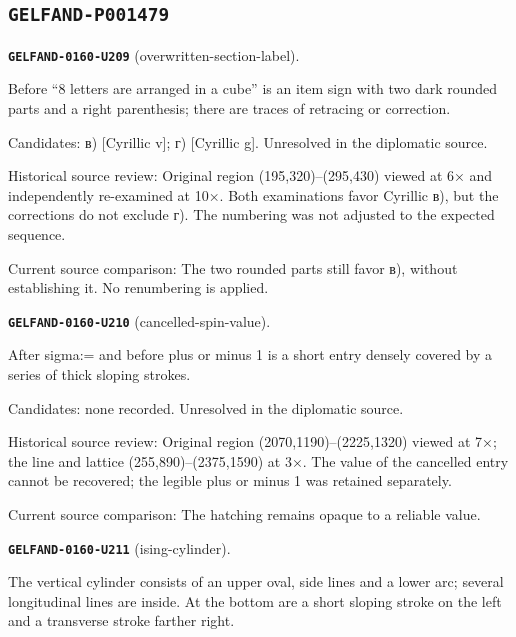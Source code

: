 \subsection*{\texttt{GELFAND-P001479}}
\par\noindent\leavevmode{}\label{GELFAND-0160-U209}\label{GELFAND-P001479:overwritten-section-label}\textbf{\texttt{GELFAND-0160-U209}} (overwritten-section-label).\nopagebreak[4]\par
Before “8 letters are arranged in a cube” is an item sign with two dark rounded parts and a right parenthesis; there are traces of retracing or correction.\par
Candidates: в) [Cyrillic v]; г) [Cyrillic g]. Unresolved in the diplomatic source.\par
Historical source review: Original region (195,320)–(295,430) viewed at 6× and independently re-examined at 10×. Both examinations favor Cyrillic в), but the corrections do not exclude г). The numbering was not adjusted to the expected sequence.\par
Current source comparison: The two rounded parts still favor в), without establishing it. No renumbering is applied.\par\medskip
\par\noindent\leavevmode{}\label{GELFAND-0160-U210}\label{GELFAND-P001479:cancelled-spin-value}\textbf{\texttt{GELFAND-0160-U210}} (cancelled-spin-value).\nopagebreak[4]\par
After sigma:= and before plus or minus 1 is a short entry densely covered by a series of thick sloping strokes.\par
Candidates: none recorded. Unresolved in the diplomatic source.\par
Historical source review: Original region (2070,1190)–(2225,1320) viewed at 7×; the line and lattice (255,890)–(2375,1590) at 3×. The value of the cancelled entry cannot be recovered; the legible plus or minus 1 was retained separately.\par
Current source comparison: The hatching remains opaque to a reliable value.\par\medskip
\par\noindent\leavevmode{}\label{GELFAND-0160-U211}\label{GELFAND-P001479:ising-cylinder}\textbf{\texttt{GELFAND-0160-U211}} (ising-cylinder).\nopagebreak[4]\par
The vertical cylinder consists of an upper oval, side lines and a lower arc; several longitudinal lines are inside. At the bottom are a short sloping stroke on the left and a transverse stroke farther right.\par
